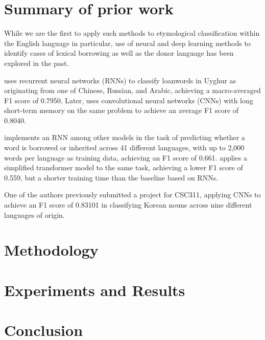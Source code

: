 \documentclass[11pt]{article}
\begin{document}
	\section{Summary of prior work}     %
	
	While we are the first to apply such methods to etymological classification within the English language in particular, use of neural and deep learning methods to identify cases of lexical borrowing as well as the donor language has been explored in the past.
	
	 uses recurrent neural networks (RNNs) to classify loanwords in Uyghur as originating from one of Chinese, Russian, and Arabic, achieving a macro-averaged F1 score of 0.7950. Later,  uses convolutional neural networks (CNNs) with long short-term memory on the same problem to achieve an average F1 score of 0.8040.
	
	 implements an RNN among other models in the task of predicting whether a word is borrowed or inherited across 41 different languages, with up to 2,000 words per language as training data, achieving an F1 score of 0.661.  applies a simplified transformer model to the same task, achieving a lower F1 score of 0.559, but a shorter training time than the baseline based on RNNs.
	
	One of the authors previously submitted a project for CSC311, applying CNNs to achieve an F1 score of 0.83101 in classifying Korean nouns across nine different languages of origin.
	
	\section{Methodology}
	
	\section{Experiments and Results}
	
	\section{Conclusion}
	
	
	
\end{document}
